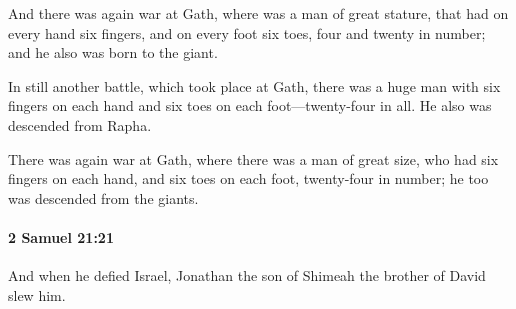 			\begin{versebox}
					\item[BHS] 
					\item[ASV] And there was again war at Gath, where was a man of great stature, that had on every hand six fingers, and on every foot six toes, four and twenty in number; and he also was born to the giant.
					\item[NIV] In still another battle, which took place at Gath, there was a huge man with six fingers on each hand and six toes on each foot—twenty-four in all. He also was descended from Rapha.
					\item[NRSV] There was again war at Gath, where there was a man of great size, who had six fingers on each hand, and six toes on each foot, twenty-four in number; he too was descended from the giants.
			\end{versebox}

		\paragraph{2 Samuel 21:21} %
			\label{2SAMUEL-21-21}

			And when he defied Israel, Jonathan the son of Shimeah the brother of David slew him.

